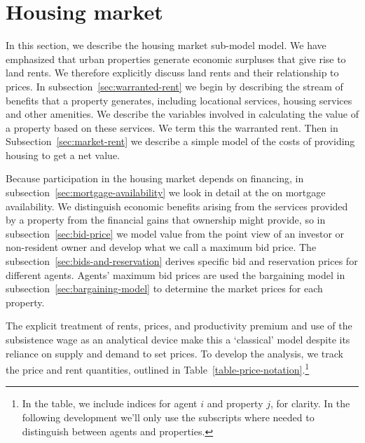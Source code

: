 \section{Housing market} \label{section-rent}
In this section, we describe the housing market sub-model model. %
We have emphasized that urban properties generate economic surpluses that give rise to land rents. We therefore explicitly discuss land rents and their relationship to prices. In subsection~\ref{sec:warranted-rent} we begin by describing the stream of benefits that a property generates, including locational services, housing services and other amenities.  We describe the variables involved in calculating the value of a property based on these services. We term this the \gls{warranted rent}. Then in Subsection~\ref{sec:market-rent} we describe a simple model of the costs of providing housing to get a net value. 


Because participation in the housing market depends on financing, in subsection~\ref{sec:mortgage-availability} we look in detail at the on mortgage availability. We distinguish economic benefits arising from the services provided by a property from the financial gains that ownership might provide, so in subsection~\ref{sec:bid-price} we model value  from the point view of an investor or non-resident owner and develop what we call a maximum bid price.  The subsection~\ref{sec:bids-and-reservation} derives specific bid and reservation prices for different agents. Agents' maximum bid prices are used the bargaining model in subsection~\ref{sec:bargaining-model}  to determine the market prices for each property. 


 The explicit treatment of rents, prices, and  productivity \gls{premium} and use of the \gls{subsistence wage} as an analytical device  make this a `\gls{classical}' model despite its reliance on supply and demand to set prices.  To develop the analysis, we track the price and rent quantities, outlined in Table~\ref{table-price-notation}.\footnote{In the table, we include indices for agent $i$ and property $j$, for clarity. In the following development we'll only use the subscripts where needed to distinguish between agents and properties.}

